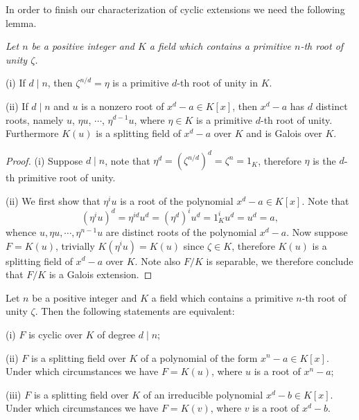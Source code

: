 In order to finish our characterization of cyclic extensions we need the following lemma.
\begin{lemma}\em
Let $n$ be a positive integer and $K$ a field which contains a primitive $n$-th root of unity $\zeta$.\par
(i) If $d\mid n$, then $\zeta^{n/d}=\eta$ is a primitive $d$-th root of unity in $K$.\par
(ii) If $d\mid n$ and $u$ is a nonzero root of $x^d-a\in K[x]$, then $x^d-a$ has $d$ distinct roots, namely $u$, $\eta u$, $\cdots$, $\eta^{d-1}u$, where $\eta\in K$ is a primitive $d$-th root of unity. Furthermore $K(u)$ is a splitting field of $x^d-a$ over $K$ and is Galois over $K$.
\end{lemma}
\begin{proof}
(i) Suppose $d\mid n$, note that $\eta^d=(\zeta^{n/d})^d=\zeta^n=1_K$, therefore $\eta$ is the $d$-th primitive root of unity.\par
(ii) We first show that $\eta^iu$ is a root of the polynomial $x^d-a\in K[x]$. Note that 
$$
\left( \eta ^iu \right) ^d=\eta ^{id}u^d=\left( \eta ^d \right) ^iu^d=1_{K}^{i}u^d=u^d=a,
$$
whence $u,\eta u,\cdots,\eta^{n-1}u$ are distinct roots of the polynomial $x^d-a$. Now suppose $F=K(u)$, trivially $K(\eta^iu)=K(u)$ since $\zeta\in K$, therefore $K(u)$ is a splitting field of $x^d-a$ over $K$. Note also $F/K$ is separable, we therefore conclude that $F/K$ is a Galois extension.
\end{proof}
\begin{theorem}
Let $n$ be a positive integer and $K$ a field which contains a primitive $n$-th root of unity $\zeta$. Then the following statements are equivalent: \par
(i) $F$ is cyclic over $K$ of degree $d\mid n$;\par
(ii) $F$ is a splitting field over $K$ of a polynomial of the form $x^n-a\in K[x]$. Under which circumstances we have $F=K(u)$, where $u$ is a root of $x^n-a$;\par
(iii) $F$ is a splitting field over $K$ of an irreducible polynomial $x^d-b\in K[x]$. Under which circumstances we have $F=K(v)$, where $v$ is a root of $x^d-b$.
\end{theorem}
